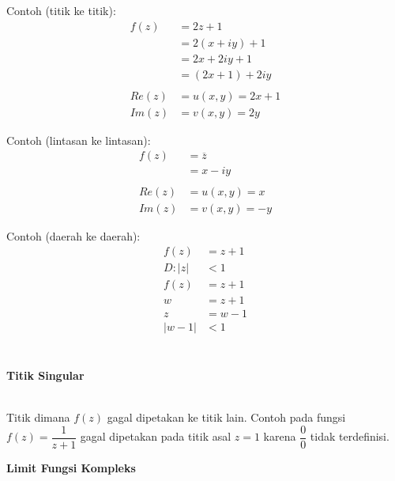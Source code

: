 \documentclass{article}
\begin{document}
Contoh (titik ke titik):
\begin{align}
    f(z)  & = 2z + 1
    \nonumber                 \\
          & = 2(x+iy) + 1
    \nonumber                 \\
          & = 2x + 2iy + 1
    \nonumber                 \\
          & = (2x + 1) + 2iy
    \nonumber                 \\
    \nonumber                 \\
    Re(z) & = u(x,y) = 2x + 1
    \nonumber                 \\
    Im(z) & = v(x,y) = 2y
    \nonumber
\end{align}

Contoh (lintasan ke lintasan):
\begin{align}
    f(z)  & = \overline{z}
    \nonumber              \\
          & = x - iy
    \nonumber              \\
    \nonumber              \\
    Re(z) & = u(x,y) = x
    \nonumber              \\
    Im(z) & = v(x,y) = -y
    \nonumber
\end{align}

Contoh (daerah ke daerah):
\begin{align}
    f(z)    & = z + 1
    \nonumber         \\
    D : |z| & <1
    \nonumber         \\
    f(z)    & = z + 1
    \nonumber         \\
    w       & = z + 1
    \nonumber         \\
    z       & = w - 1
    \nonumber         \\
    |w-1|   & < 1
    \nonumber         \\
    \nonumber
\end{align}
\\

\begin{center}
    \textbf{Titik Singular}
\end{center}
\leavevmode\\

Titik dimana $f(z)$ gagal dipetakan ke titik lain. Contoh pada fungsi $f(z) = \dfrac{1}{z+1}$ gagal dipetakan pada titik asal $z=1$ karena $\dfrac{0}{0}$ tidak terdefinisi.



\newpage
\begin{center}
    \textbf{Limit Fungsi Kompleks}
\end{center}
\leavevmode\\
\end{document}
